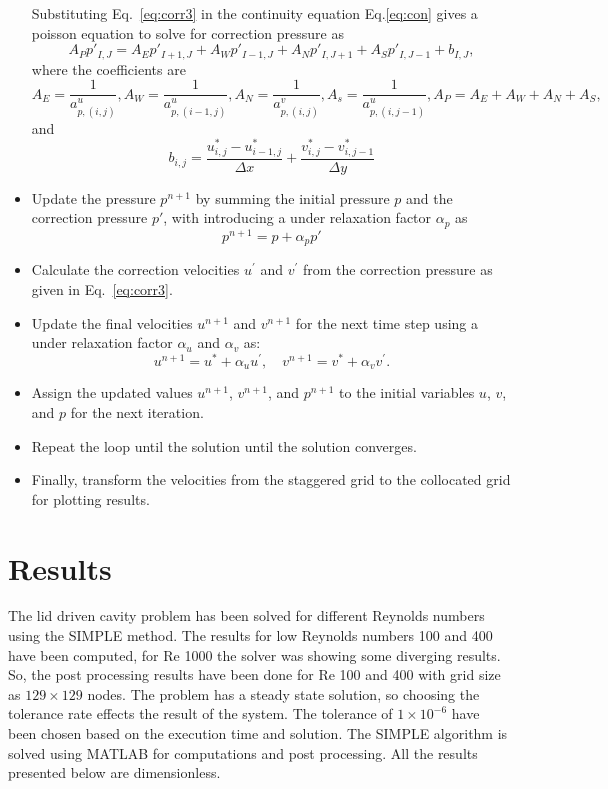 \documentclass{article}
\numberwithin{equation}{section}
\numberwithin{figure}{section}
\begin{document}
\begin{itemize}
    Substituting Eq.~\ref{eq:corr3} in the continuity equation Eq.\ref{eq:con} gives a poisson equation to solve for correction pressure as
    \begin{equation}
        A_P p'_{I,J} = A_E p'_{I+1,J} +A_W p'_{I-1,J} + A_N p'_{I,J+1} +A_S p'_{I,J-1} + b_{I,J},
    \end{equation}
    where the coefficients are
    \begin{equation}
        A_E = \frac{1}{a_{p,(i,j)}^u},  A_W = \frac{1}{a_{p,(i-1,j)}^u},  A_N = \frac{1}{a_{p,(i,j)}^v},  A_s = \frac{1}{a_{p,(i,j-1)}^u}, A_P= A_E + A_W+A_N+A_S,
    \end{equation}
    and 
    \begin{equation}
        b_{i,j} = \frac{u^\ast_{i,j}-u^\ast_{i-1,j}}{\Delta x}+\frac{v^\ast_{i,j}-v^\ast_{i,j-1}}{\Delta y}
    \end{equation}
    
 
    \item Update the pressure \( p^{n+1} \) by summing the initial pressure \( p \) and the correction pressure \( p' \), with introducing a under relaxation factor $\alpha_p$ as
    \begin{equation}
        p^{n+1} = p + \alpha_pp'
    \end{equation}
    \item Calculate the correction velocities \( u^\prime \) and \( v^\prime \) from the correction pressure as given in Eq.~\ref{eq:corr3}. 
    \item Update the final velocities \( u^{n+1} \) and \( v^{n+1} \) for the next time step using a under relaxation factor $\alpha_u$ and $\alpha_v$ as:
    \[
    u^{n+1} = u^\ast + \alpha_uu^\prime, \quad v^{n+1} = v^\ast + \alpha_v v^\prime.
    \]
    \item Assign the updated values \( u^{n+1} \), \( v^{n+1} \), and \( p^{n+1} \) to the initial variables \( u \), \( v \), and \( p \) for the next iteration.
    \item Repeat the loop until the solution until the solution converges.
    \item Finally, transform the velocities from the staggered grid to the collocated grid for plotting results.
\end{itemize}

\section{Results}
The lid driven cavity problem has been solved for different Reynolds numbers using the SIMPLE method. The results for low Reynolds numbers 100 and 400 have been computed, for Re 1000 the solver was showing some diverging results. So, the post processing results have been done for Re 100 and 400 with grid size as $129\times129$ nodes.
The problem has a steady state solution, so choosing the tolerance rate effects the result of the system. The tolerance of $1\times 10^{-6}$ have been chosen based on the execution time and solution. The SIMPLE algorithm is solved using MATLAB for computations and post processing.  All the results presented below are dimensionless.
\end{document}
